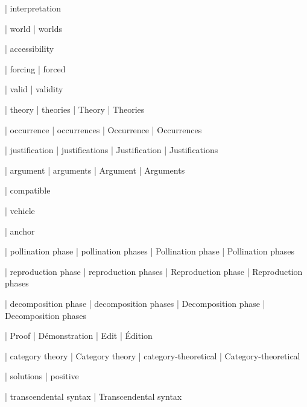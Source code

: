 | interpretation

 | world
 | worlds

 | accessibility

 | forcing
 | forced

 | valid
 | validity

 | theory
 | theories
 | Theory
 | Theories
 
 | occurrence
 | occurrences
 | Occurrence
 | Occurrences

 | justification
 | justifications
 | Justification
 | Justifications

 | argument
 | arguments
 | Argument
 | Arguments

 | compatible

 | vehicle

 | anchor
 
 | pollination phase
 | pollination phases
 | Pollination phase
 | Pollination phases

 | reproduction phase
 | reproduction phases
 | Reproduction phase
 | Reproduction phases

 | decomposition phase
 | decomposition phases
 | Decomposition phase
 | Decomposition phases

\newcommand\fpmode[1]{\begingroup\textsc{#1}\endgroup}
 | Proof
 | Démonstration
 | Edit
 | Édition






 | category theory
 | Category theory
 | category-theoretical
 | Category-theoretical


 | solutions
 | positive
 
 | transcendental syntax
 | Transcendental syntax